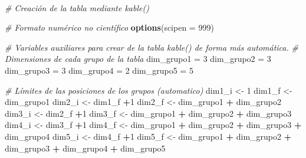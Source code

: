 \documentclass[
]{article}
\newenvironment{Shaded}{\begin{snugshade}}{\end{snugshade}}
\newcommand{\CommentTok}[1]{\textcolor[rgb]{0.56,0.35,0.01}{\textit{#1}}}
\newcommand{\DataTypeTok}[1]{\textcolor[rgb]{0.13,0.29,0.53}{#1}}
\newcommand{\DecValTok}[1]{\textcolor[rgb]{0.00,0.00,0.81}{#1}}
\newcommand{\KeywordTok}[1]{\textcolor[rgb]{0.13,0.29,0.53}{\textbf{#1}}}
\newcommand{\NormalTok}[1]{#1}
\newcommand{\OperatorTok}[1]{\textcolor[rgb]{0.81,0.36,0.00}{\textbf{#1}}}
\newcommand{\StringTok}[1]{\textcolor[rgb]{0.31,0.60,0.02}{#1}}
\begin{document}
\texttt{}~\\
\texttt{}

\begin{Shaded}
\begin{Highlighting}[]
\CommentTok{# Creación de la tabla mediante kable()}

\CommentTok{# Formato numérico no científico}
\KeywordTok{options}\NormalTok{(}\DataTypeTok{scipen =} \DecValTok{999}\NormalTok{)}

\CommentTok{# Variables auxiliares para crear de la tabla kable() de forma más automática.}
\CommentTok{# Dimensiones de cada grupo de la tabla}
\NormalTok{dim_grupo1 =}\StringTok{ }\DecValTok{3}
\NormalTok{dim_grupo2 =}\StringTok{ }\DecValTok{3}
\NormalTok{dim_grupo3 =}\StringTok{ }\DecValTok{3}
\NormalTok{dim_grupo4 =}\StringTok{ }\DecValTok{2}
\NormalTok{dim_grupo5 =}\StringTok{ }\DecValTok{5}

\CommentTok{# Límites de las posiciones de los grupos (automatico)}
\NormalTok{dim1_i <-}\StringTok{ }\DecValTok{1}
\NormalTok{dim1_f <-}\StringTok{ }\NormalTok{dim_grupo1}
\NormalTok{dim2_i <-}\StringTok{ }\NormalTok{dim1_f }\OperatorTok{+}\DecValTok{1}
\NormalTok{dim2_f <-}\StringTok{ }\NormalTok{dim_grupo1 }\OperatorTok{+}\StringTok{ }\NormalTok{dim_grupo2}
\NormalTok{dim3_i <-}\StringTok{ }\NormalTok{dim2_f }\OperatorTok{+}\DecValTok{1}
\NormalTok{dim3_f <-}\StringTok{ }\NormalTok{dim_grupo1 }\OperatorTok{+}\StringTok{ }\NormalTok{dim_grupo2 }\OperatorTok{+}\StringTok{ }\NormalTok{dim_grupo3}
\NormalTok{dim4_i <-}\StringTok{ }\NormalTok{dim3_f }\OperatorTok{+}\DecValTok{1}
\NormalTok{dim4_f <-}\StringTok{ }\NormalTok{dim_grupo1 }\OperatorTok{+}\StringTok{ }\NormalTok{dim_grupo2 }\OperatorTok{+}\StringTok{ }\NormalTok{dim_grupo3 }\OperatorTok{+}\StringTok{ }\NormalTok{dim_grupo4}
\NormalTok{dim5_i <-}\StringTok{ }\NormalTok{dim4_f }\OperatorTok{+}\DecValTok{1}
\NormalTok{dim5_f <-}\StringTok{ }\NormalTok{dim_grupo1 }\OperatorTok{+}\StringTok{ }\NormalTok{dim_grupo2 }\OperatorTok{+}\StringTok{ }\NormalTok{dim_grupo3 }\OperatorTok{+}\StringTok{ }\NormalTok{dim_grupo4 }\OperatorTok{+}\StringTok{ }\NormalTok{dim_grupo5}


\end{Highlighting}
\end{Shaded}
\end{document}
